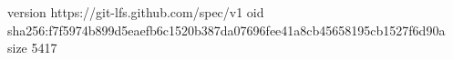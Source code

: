 version https://git-lfs.github.com/spec/v1
oid sha256:f7f5974b899d5eaefb6c1520b387da07696fee41a8cb45658195cb1527f6d90a
size 5417
